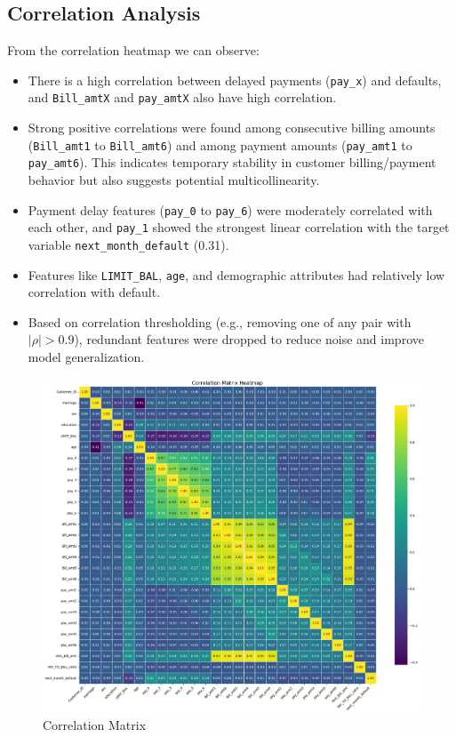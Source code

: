 \documentclass[12pt,a4paper]{article}
\begin{document}

\subsection{Correlation Analysis}
From the correlation heatmap we can observe:
\begin{itemize}
    \item There is a high correlation between delayed payments (\texttt{pay\_x}) and defaults, and \texttt{Bill\_amtX} and \texttt{pay\_amtX} also have high correlation.
    \item Strong positive correlations were found among consecutive billing amounts (\texttt{Bill\_amt1} to \texttt{Bill\_amt6}) and among payment amounts (\texttt{pay\_amt1} to \texttt{pay\_amt6}). This indicates temporary stability in customer billing/payment behavior but also suggests potential multicollinearity.
    \item Payment delay features (\texttt{pay\_0} to \texttt{pay\_6}) were moderately correlated with each other, and \texttt{pay\_1} showed the strongest linear correlation with the target variable \texttt{next\_month\_default} (0.31).
    \item Features like \texttt{LIMIT\_BAL}, \texttt{age}, and demographic attributes had relatively low correlation with default.
    \item Based on correlation thresholding (e.g., removing one of any pair with $|\rho| > 0.9$), redundant features were dropped to reduce noise and improve model generalization.
\end{itemize}
\begin{figure}[H]
    \centering
    \includegraphics[width=1\textwidth]{figures/4.png}
    \caption{Correlation Matrix}
\end{figure}
\end{document}
